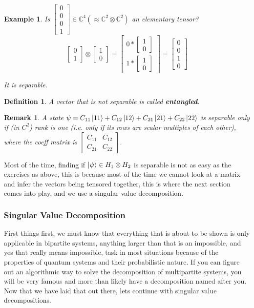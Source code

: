 \documentclass[12pt]{article}
\theoremstyle{plain}
\theoremstyle{nonumberplain}
\theoremstyle{plain}
\newtheorem{definition}[lemma]{Definition}
\newtheorem{example}[lemma]{Example}
\newtheorem{remark}[lemma]{Remark}
\theoremstyle{nonumberplain}
\newcommand\1{{\bf 1}}
\newcommand{\bmat}[1]{\begin{bmatrix*} #1 \end{bmatrix*}} %
\newcommand{\C}{\mathbb{C}} %
\newcommand{\<}{\left\langle}
\renewcommand{\>}{\right\rangle}
\begin{document}
\begin{example} Is $\bmat{0\\0\\0\\1} \in \C^4 (\approx \C^2 \otimes \C^2)$ an elementary tensor?
\begin{equation}
\bmat{0\\1} \otimes \bmat{1\\0} = \bmat{{0*\bmat{1\\0}}\\{1*\bmat{1\\0}}} = \bmat{0\\0\\1\\0}
\end{equation}
\begin{center}
It \textit{is} separable.
\end{center}
\end{example}

\begin{definition}
A vector that is \textit{not} separable is called \textbf{entangled}.
\end{definition}

\begin{remark}
A state $\psi = C_{11}\ket{11} + C_{12}\ket{12} + C_{21}\ket{21} + C_{22}\ket{22}$ is separable only if (in $C^2$) rank is one (i.e. only if its rows are scalar multiples of each other), where the coeff matrix is $\bmat{C_{11} &C_{12}\\C_{21} &C_{22}}$.
\end{remark}

Most of the time, finding if $\ket{\psi} \in H_1 \otimes H_2$ is separable is not as easy as the exercises as above, this is because most of the time we cannot look at a matrix and infer the vectors being tensored together, this is where the next section comes into play, and we use a singular value decomposition.

\pagebreak
\subsubsection{Singular Value Decomposition} First things first, we must know that everything that is about to be shown is only applicable in bipartite systems, anything larger than that is an impossible, and yes that really means impossible, task in most situations because of the properties of quantum systems and their probabilistic nature.  If you can figure out an algorithmic way to solve the decomposition of multipartite systems, you will be very famous and more than likely have a decomposition named after you.  Now that we have laid that out there, lets continue with singular value decompositions.  
\end{document}
